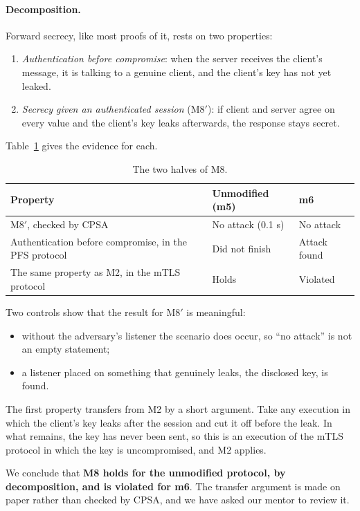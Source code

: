 \documentclass[11pt]{article}
\begin{document}
\paragraph{Decomposition.} Forward secrecy, like most proofs of it, rests on two properties:
\begin{enumerate}
    \item \textit{Authentication before compromise}: when the server receives the client's message, it is talking to a genuine client, and the client's key has not yet leaked.
    \item \textit{Secrecy given an authenticated session} (M8$'$): if client and server agree on every value and the client's key leaks afterwards, the response stays secret.
\end{enumerate}
Table~\ref{tab:m8} gives the evidence for each.

\begin{table}[h!]
\centering
\small
\begin{tabular}{|p{6.8cm}|p{3.8cm}|p{3.8cm}|}
\hline
\textbf{Property} & \textbf{Unmodified (m5)} & \textbf{m6} \\
\hline
M8$'$, checked by CPSA & No attack (0.1 s) & No attack \\
Authentication before compromise, in the PFS protocol & Did not finish & Attack found \\
The same property as M2, in the mTLS protocol & Holds & Violated \\
\hline
\end{tabular}
\caption{The two halves of M8.}
\label{tab:m8}
\end{table}

Two controls show that the result for M8$'$ is meaningful:
\begin{itemize}
    \item without the adversary's listener the scenario does occur, so ``no attack'' is not an empty statement;
    \item a listener placed on something that genuinely leaks, the disclosed key, is found.
\end{itemize}

The first property transfers from M2 by a short argument. Take any execution in which the client's key leaks after the session and cut it off before the leak. In what remains, the key has never been sent, so this is an execution of the mTLS protocol in which the key is uncompromised, and M2 applies.

We conclude that \textbf{M8 holds for the unmodified protocol, by decomposition, and is violated for m6}. The transfer argument is made on paper rather than checked by CPSA, and we have asked our mentor to review it.
\end{document}
